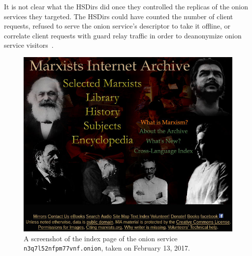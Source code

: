 It is not clear what the HSDirs did once they controlled the replicas
of the onion services they targeted.  The HSDirs could have counted the number
of client requests, refused to serve the onion service's descriptor to take it
offline, or correlate client requests with guard relay traffic in order to 
deanonymize onion service visitors~\cite{Dingledine2014a}.

\begin{figure}[t]
	\centering
	\includegraphics[width=\linewidth]{figures/marxists-internet-archive.jpg}
	\caption{A screenshot of the index page of the onion service
		\texttt{n3q7l52nfpm77vnf.onion}, taken on February 13, 2017.}
	\label{fig:archive}
\end{figure}
